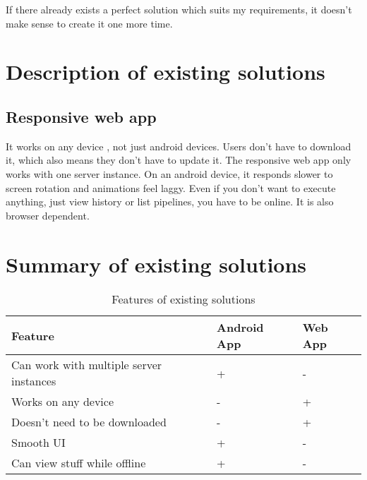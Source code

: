 If there already exists a perfect solution which suits my requirements, it doesn't make sense to create it one more time.

\section{Description of existing solutions}

\subsection{Responsive web app}
It  works on any device , not just android devices.
Users don't have to download it, which also means they don't have to update it.
The responsive web app only works with one server instance.
On an android device, it responds slower to screen rotation and animations feel laggy.
Even if you don't want to execute anything, just view history or list pipelines, you have to be online.
It is also browser dependent.

\section{Summary of existing solutions}

\begin{table}[h]\centering
\caption[Existing solutions]{Features of existing solutions}\label{tab:existingSolutionsTable}
\begin{tabular}{l|l|l}
\hline
Feature & Android App & Web App \\ \hline
Can work with multiple server instances & + & - \\ \hline
Works on any device & - & + \\ \hline
Doesn't need to be downloaded & - & + \\ \hline
Smooth UI & + & - \\ \hline
Can view stuff while offline & + & - \\ \hline
\end{tabular}
\end{table}